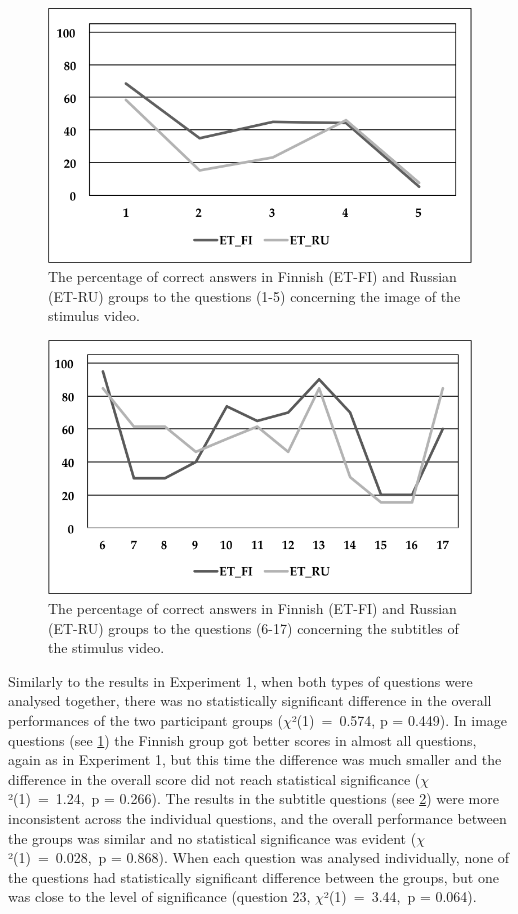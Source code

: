 \documentclass[output=paper]{langsci/langscibook}
\begin{document}
\begin{figure}[h]
 \includegraphics[width=\textwidth]{figures/Lang3.png}
 \caption{The percentage of correct answers in Finnish (ET-FI) and Russian (ET-RU) groups to the questions (1-5) concerning the image of the stimulus video.}
 \label{lang:fig:3}
\end{figure} 

\begin{figure}[h]
 \includegraphics[width=\textwidth]{figures/Lang4.png}
 \caption{The percentage of correct answers in Finnish (ET-FI) and Russian (ET-RU) groups to the questions (6-17) concerning the subtitles of the stimulus video.}
 \label{lang:fig:4}
\end{figure} 

Similarly to the results in Experiment 1, when both types of questions were analysed together, there was no statistically significant difference in the overall performances of the two participant groups ($\chi $²(1)~=~0.574, p = 0.449). In image questions (see \ref{lang:fig:3}) the Finnish group got better scores in almost all questions, again as in Experiment 1, but this time the difference was much smaller and the difference in the overall score did not reach statistical significance ($\chi $²(1)~=~1.24,~p = 0.266). The results in the subtitle questions (see \ref{lang:fig:4}) were more inconsistent across the individual questions, and the overall performance between the groups was similar and no statistical significance was evident ($\chi $²(1)~=~0.028,~p = 0.868). When each question was analysed individually, none of the questions had statistically significant difference  between the groups, but one was close to the level of significance (question 23, $\chi $²(1)~=~3.44,~p = 0.064).
\end{document}
